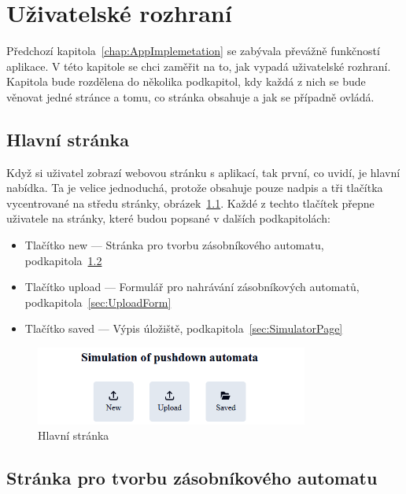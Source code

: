 \chapter{Uživatelské rozhraní}

Předchozí kapitola~\ref{chap:AppImplemetation} se zabývala převážně funkčností aplikace. V této kapitole se chci zaměřit na to, jak vypadá uživatelské rozhraní. Kapitola bude rozdělena do několika podkapitol, kdy každá z nich se bude věnovat jedné stránce a tomu, co stránka obsahuje a jak se případně ovládá.

\section{Hlavní stránka}

Když si uživatel zobrazí webovou stránku s aplikací, tak první, co uvidí, je hlavní nabídka. Ta je velice jednoduchá, protože obsahuje pouze nadpis a tři tlačítka vycentrované na středu stránky, obrázek~\ref{fig:UIMainPage}. Každé z techto tlačítek přepne uživatele na stránky, které budou popsané v dalších podkapitolách:
\begin{itemize}
    \item Tlačítko new --- Stránka pro tvorbu zásobníkového automatu, podkapitola~\ref{sec:PDABuilder}
    \item Tlačítko upload --- Formulář pro nahrávání zásobníkových automatů, podkapitola~\ref{sec:UploadForm}
    \item Tlačítko saved --- Výpis úložiště, podkapitola~\ref{sec:SimulatorPage}
\end{itemize}

\begin{figure}[h]
    \centering
    \includegraphics[width=0.8\textwidth]{Figures/PrntScrn_UI_MainMenu.png}
    \caption{Hlavní stránka}\label{fig:UIMainPage}
\end{figure}

\section{Stránka pro tvorbu zásobníkového automatu}\label{sec:PDABuilder}

